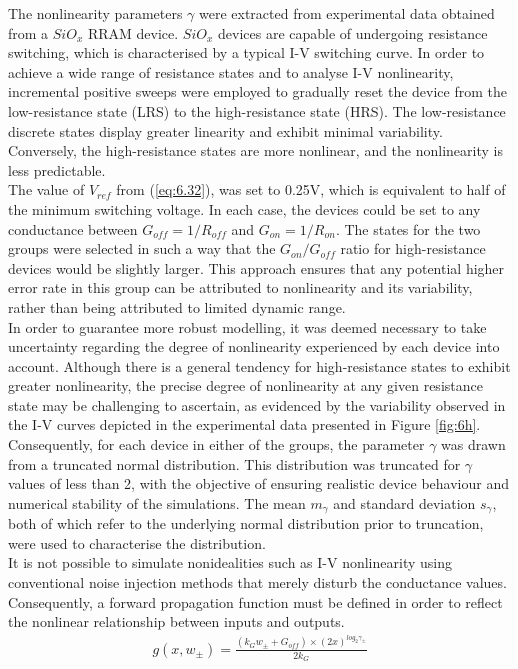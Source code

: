 \noindent The nonlinearity parameters $\gamma$ were extracted from experimental data obtained from a $SiO_x$ RRAM device. $SiO_x$ devices are capable of undergoing resistance switching, which is characterised by a typical I-V switching curve. In order to achieve a wide range of resistance states and to analyse I-V nonlinearity, incremental positive sweeps were employed to gradually reset the device from the low-resistance state (LRS) to the high-resistance state (HRS). The low-resistance discrete states display greater linearity and exhibit minimal variability. Conversely, the high-resistance states are more nonlinear, and the nonlinearity is less predictable.\\

\noindent The value of $V_{ref}$ from (\ref{eq:6.32}), was set to 0.25V, which is equivalent to half of the minimum switching voltage. In each case, the devices could be set to any conductance between $G_{off} = 1/R_{off}$ and $G_{on} = 1/R_{on}$. The states for the two groups were selected in such a way that the $G_{on}/G_{off}$ ratio for high-resistance devices would be slightly larger. This approach ensures that any potential higher error rate in this group can be attributed to nonlinearity and its variability, rather than being attributed to limited dynamic range.\\

\noindent In order to guarantee more robust modelling, it was deemed necessary to take uncertainty regarding the degree of nonlinearity experienced by each device into account. Although there is a general tendency for high-resistance states to exhibit greater nonlinearity, the precise degree of nonlinearity at any given resistance state may be challenging to ascertain, as evidenced by the variability observed in the I-V curves depicted in the experimental data presented in Figure \ref{fig:6h}. \\

\noindent Consequently, for each device in either of the groups, the parameter $\gamma$ was drawn from a truncated normal distribution. This distribution was truncated for $\gamma$ values of less than 2, with the objective of ensuring realistic device behaviour and numerical stability of the simulations. The mean $m_\gamma$ and standard deviation $s_\gamma$, both of which refer to the underlying normal distribution prior to truncation, were used to characterise the distribution.\\

\noindent It is not possible to simulate nonidealities such as I-V nonlinearity using conventional noise injection methods that merely disturb the conductance values. Consequently, a forward propagation function must be defined in order to reflect the nonlinear relationship between inputs and outputs.
\begin{align}
g(x, w_\pm) = \frac{\left( k_Gw_\pm + G_{off}\right) \times \left( 2x \right)^{log_2\gamma_\pm}}{2k_G} \label{eq:6.34}
\end{align}

